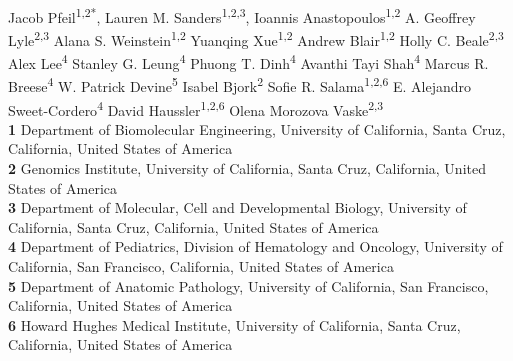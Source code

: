 \documentclass[10pt,letterpaper]{article}
\begin{document}
\vspace*{0.2in}

\begin{flushleft}
{\Large
\textbf{} %
}
\newline
\\
Jacob Pfeil\textsuperscript{1,2*},
Lauren M. Sanders\textsuperscript{1,2,3},
Ioannis Anastopoulos\textsuperscript{1,2}
A. Geoffrey Lyle\textsuperscript{2,3}
Alana S. Weinstein\textsuperscript{1,2}
Yuanqing Xue\textsuperscript{1,2}
Andrew Blair\textsuperscript{1,2}
Holly C. Beale\textsuperscript{2,3}
Alex Lee\textsuperscript{4}
Stanley G. Leung\textsuperscript{4}
Phuong T. Dinh\textsuperscript{4}
Avanthi Tayi Shah\textsuperscript{4}
Marcus R. Breese\textsuperscript{4}
W. Patrick Devine\textsuperscript{5}
Isabel Bjork\textsuperscript{2}
Sofie R. Salama\textsuperscript{1,2,6}
E. Alejandro Sweet-Cordero\textsuperscript{4}
David Haussler\textsuperscript{1,2,6}
Olena Morozova Vaske\textsuperscript{2,3}
\\
\bigskip
\textbf{1} Department of Biomolecular Engineering, University of California, Santa Cruz, California, United States of America
\\
\textbf{2} Genomics Institute, University of California, Santa Cruz, California, United States of America
\\
\textbf{3} Department of Molecular, Cell and Developmental Biology, University of California, Santa Cruz, California, United States of America
\\
\textbf{4} Department of Pediatrics, Division of Hematology and Oncology, University of California, San Francisco, California, United States of America
\\
\textbf{5} Department of Anatomic Pathology, University of California, San Francisco, California, United States of America
\\
\textbf{6} Howard Hughes Medical Institute, University of California, Santa Cruz, California, United States of America
\\
\bigskip


\end{flushleft}
\end{document}

